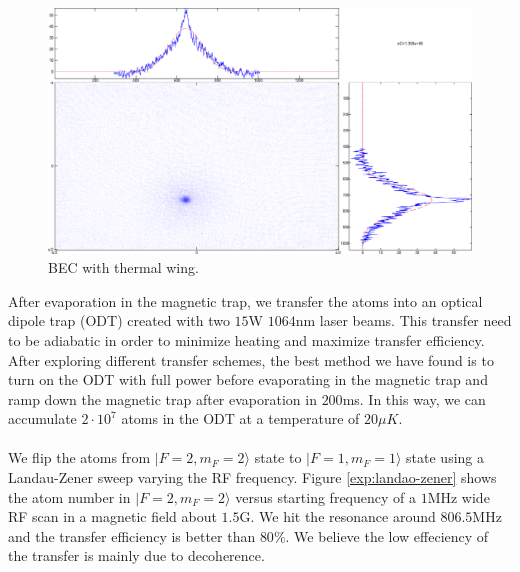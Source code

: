 \begin{figure}
  \begin{center}
    \includegraphics[width=12cm]{bec.png}
  \end{center}
  \caption{BEC with thermal wing.}
  \label{exp:bec-image}
\end{figure}
After evaporation in the magnetic trap, we transfer the atoms into an optical dipole trap (ODT) created with two $15$W $1064$nm laser beams. This transfer need to be adiabatic in order to minimize heating and maximize transfer efficiency. After exploring different transfer schemes, the best method we have found is to turn on the ODT with full power before evaporating in the magnetic trap and ramp down the magnetic trap after evaporation in $200$ms. In this way, we can accumulate $2\cdot10^7$ atoms in the ODT at a temperature of $20\mu K$.\\
\\
We flip the atoms from $|F=2, m_F=2\rangle$ state to $|F=1, m_F=1\rangle$ state using a Landau-Zener sweep varying the RF frequency. Figure \ref{exp:landao-zener} shows the atom number in $|F=2, m_F=2\rangle$ versus starting frequency of a $1$MHz wide RF scan in a magnetic field about $1.5$G. We hit the resonance around $806.5$MHz and the transfer efficiency is better than $80\%$. We believe the low effeciency of the transfer is mainly due to decoherence.\\
\\

